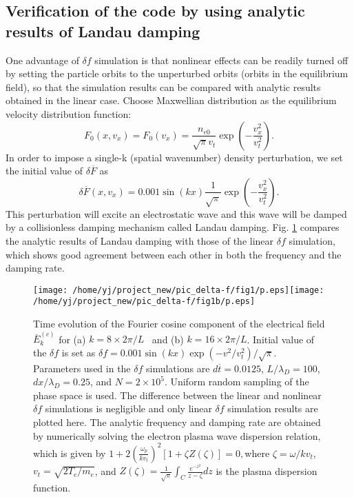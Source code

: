 \documentclass{article}
\begin{document}
\subsection{Verification of the code by using analytic results of Landau
damping}

One advantage of $\delta f$ simulation is that nonlinear effects can be
readily turned off by setting the particle orbits to the unperturbed orbits
(orbits in the equilibrium field), so that the simulation results can be
compared with analytic results obtained in the linear case. Choose Maxwellian
distribution as the equilibrium velocity distribution function:
\begin{equation}
  F_0 (x, v_x) = F_0 (v_x) = \frac{n_{e 0}}{\sqrt{\pi} v_t} \exp \left( -
  \frac{v^2_x}{v_t^2} \right) .
\end{equation}
In order to impose a single-k (spatial wavenumber) density perturbation, we
set the initial value of $\delta \overline{F}$ as
\begin{equation}
  \label{16-4-18-p1} \delta \overline{F} (x, v_x) = 0.001 \sin (k x)
  \frac{1}{\sqrt{\pi}} \exp \left( - \frac{v^2_x}{v_t^2} \right) .
\end{equation}
This perturbation will excite an electrostatic wave and this wave will be
damped by a collisionless damping mechanism called Landau damping. Fig.
\ref{3-22-a1} compares the analytic results of Landau damping with those of
the linear $\delta f$ simulation, which shows good agreement between each
other in both the frequency and the damping rate.

\begin{figure}[h]
  \texttt{[image: /home/yj/project\_new/pic\_delta-f/fig1/p.eps]}\texttt{[image: /home/yj/project\_new/pic\_delta-f/fig1b/p.eps]}
  \caption{\label{3-22-a1}Time evolution of the Fourier cosine component of
  the electrical field $\overline{E}_k^{(c)}$ for (a) $k = 8 \times 2 \pi / L$
  \ and (b) $k = 16 \times 2 \pi / L$. Initial value of the $\delta f$ is set
  as $\delta f = 0.001 \sin (k x) \exp (- v^2 / v_t^2) / \sqrt{\pi}$.
  Parameters used in the $\delta f$ simulations are $d \overline{t} = 0.0125$,
  $L / \lambda_D = 100$, $d x / \lambda_D = 0.25$, and $N = 2 \times 10^5$.
  Uniform random sampling of the phase space is used. The difference between
  the linear and nonlinear $\delta f$ simulations is negligible and only
  linear $\delta f$ simulation results are plotted here. The analytic
  frequency and damping rate are obtained by numerically solving the electron
  plasma wave dispersion relation, which is given by $1 + 2 \left(
  \frac{\omega_p}{k v_t} \right)^2 [1 + \zeta Z (\zeta)] = 0,$where $\zeta =
  \omega / k v_t$, $v_t = \sqrt{2 T_e / m_e}$, and $Z (\zeta) =
  \frac{1}{\sqrt{\pi}} \int_C \frac{e^{- z^2}}{z - \zeta} d z$ is the plasma
  dispersion function{\cite{gurnett2004}}.}
\end{figure}
\end{document}
